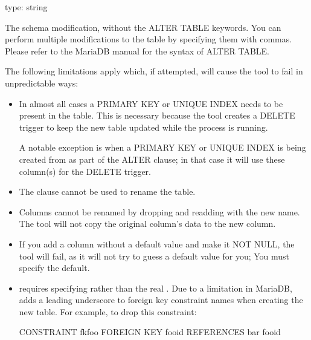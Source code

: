 \documentclass[letterpaper,10pt,english]{sphinxmanual}
\begin{document}
\begin{fulllineitems}
\label{\detokenize{mariadb-schema-change:cmdoption-mariadb-schema-change-alter}}
type: string

The schema modification, without the ALTER TABLE keywords. You can perform
multiple modifications to the table by specifying them with commas. Please refer
to the MariaDB manual for the syntax of ALTER TABLE.

The following limitations apply which, if attempted, will cause the tool
to fail in unpredictable ways:
\begin{itemize}
\item {} 
In almost all cases a PRIMARY KEY or UNIQUE INDEX needs to be present in the table.
This is necessary because the tool creates a DELETE trigger to keep the new table
updated while the process is running.

A notable exception is when a PRIMARY KEY or UNIQUE INDEX is being created from
 as part of the ALTER clause; in that case it will use these
column(s) for the DELETE trigger.

\item {} 
The  clause cannot be used to rename the table.

\item {} 
Columns cannot be renamed by dropping and re\sphinxhyphen{}adding with the new name.
The tool will not copy the original column’s data to the new column.

\item {} 
If you add a column without a default value and make it NOT NULL, the tool
will fail, as it will not try to guess a default value for you; You must
specify the default.

\item {} 
 requires specifying 
rather than the real .  Due to a limitation in MariaDB,
 adds a leading underscore to foreign key constraint
names when creating the new table.  For example, to drop this constraint:

\begin{sphinxVerbatim}[commandchars=\\\{\}]
CONSTRAINT fk\PYGZus{}foo FOREIGN KEY foo\PYGZus{}id REFERENCES bar foo\PYGZus{}id
\end{sphinxVerbatim}


\end{itemize}
\end{fulllineitems}
\end{document}
